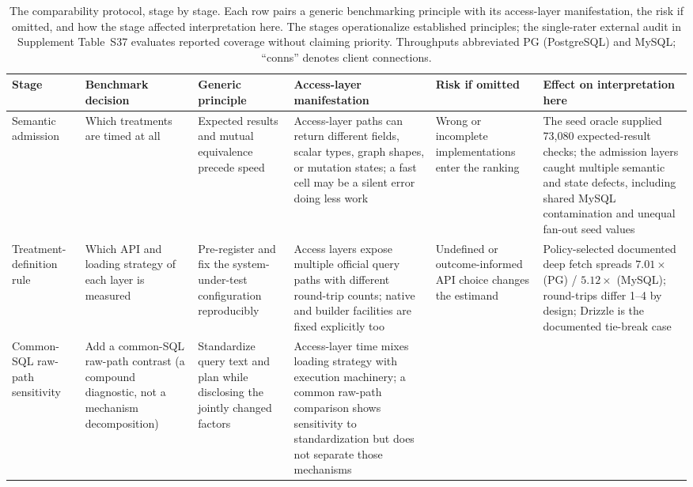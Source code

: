 \begin{table}[htbp]
  \centering
  \caption{The comparability protocol, stage by stage. Each row pairs a generic benchmarking principle with its access-layer manifestation, the risk if omitted, and how the stage affected interpretation here. The stages operationalize established principles; the single-rater external audit in Supplement Table~S37 evaluates reported coverage without claiming priority. Throughputs abbreviated PG (PostgreSQL) and MySQL; ``conns'' denotes client connections.}
  \label{tab:protocol_mapping}
  \begin{adjustbox}{max width=\textwidth,max totalheight=0.72\textheight,keepaspectratio}
  \footnotesize
  \begin{tabular}{p{1.7cm} p{2.3cm} p{2.5cm} p{3.3cm} p{2.5cm} p{3.4cm}}
    \toprule
    \textbf{Stage} & \textbf{Benchmark decision} & \textbf{Generic principle} & \textbf{Access-layer manifestation} & \textbf{Risk if omitted} & \textbf{Effect on interpretation here} \\
    \midrule
    Semantic admission &
    Which treatments are timed at all &
    Expected results and mutual equivalence precede speed &
    Access-layer paths can return different fields, scalar types, graph shapes, or mutation states; a fast cell may be a silent error doing less work &
    Wrong or incomplete implementations enter the ranking &
    The seed oracle supplied 73,080 expected-result checks; the admission layers caught multiple semantic and state defects, including shared MySQL contamination and unequal fan-out seed values \\
    \addlinespace
    Treatment-definition rule &
    Which API and loading strategy of each layer is measured &
    Pre-register and fix the system-under-test configuration reproducibly &
    Access layers expose multiple official query paths with different round-trip counts; native and builder facilities are fixed explicitly too &
    Undefined or outcome-informed API choice changes the estimand &
    Policy-selected documented deep fetch spreads $7.01\times$ (PG) / $5.12\times$ (MySQL); round-trips differ 1--4 by design; Drizzle is the documented tie-break case \\
    \addlinespace
    Common-SQL raw-path sensitivity &
    Add a common-SQL raw-path contrast (a compound diagnostic, not a mechanism decomposition) &
    Standardize query text and plan while disclosing the jointly changed factors &
    Access-layer time mixes loading strategy with execution machinery; a common raw-path comparison shows sensitivity to standardization but does not separate those mechanisms &

\end{tabular}
\end{adjustbox}
\end{table}
